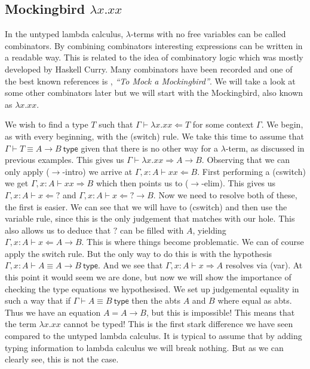 \subsection{Mockingbird \texorpdfstring{$\lambda x . x x$}{}} %

In the untyped lambda calculus, $\lambda$-terms with no free variables can be called combinators. By combining combinators interesting expressions can be written in a readable way. This is related to the idea of combinatory logic which was mostly developed by Haskell Curry. Many combinators have been recorded and one of the best known references is \cite{smullyan2012mock}, \emph{``To Mock a Mockingbird''}. We will take a look at some other combinators later but we will start with the Mockingbird, also known as $\lambda x . x x$.

\begin{example}\label{mockingbird}
    We wish to find a type $T$ such that $\Gamma \vdash \lambda x . x x \Leftarrow T$ for some context $\Gamma$. We begin, as with every beginning, with the (switch) rule. We take this time to assume that $\Gamma \vdash T \equiv A \to B \ \mathsf{type}$ given that there is no other way for a $\lambda$-term, as discussed in previous examples. This gives us $\Gamma \vdash \lambda x . x x \Rightarrow A \to B$. Observing that we can only apply ($\to$-intro) we arrive at $\Gamma , x : A\vdash x x \Leftarrow B$. First performing a (cswitch) we get $\Gamma , x : A\vdash x x \Rightarrow B$ which then points us to ($\to$-elim). This gives us $\Gamma , x : A \vdash x \Leftarrow \boxed{?}$ and $\Gamma , x : A \vdash x \Leftarrow \boxed{?} \to B$. Now we need to resolve both of these, the first is easier. We can see that we will have to (cswitch) and then use the variable rule, since this is the only judgement that matches with our hole. This also allows us to deduce that $\boxed{?}$ can be filled with $A$, yielding $\Gamma , x : A \vdash x \Leftarrow A \to B$. This is where things become problematic. We can of course apply the switch rule. But the only way to do this is with the hypothesis $\Gamma , x : A \vdash A \equiv A \to B \ \mathsf{type}$. And we see that $\Gamma , x : A \vdash x \Rightarrow A$ resolves via (var).
    At this point it would seem we are done, but now we will show the importance of checking the type equations we hypothesised. We set up judgemental equality in such a way that if $\Gamma \vdash A \equiv B \ \mathsf{type}$ then the abts $A$ and $B$ where equal as abts. Thus we have an equation $A = A \to B$, but this is impossible!
    This means that the term $\lambda x . x x$ cannot be typed! This is the first stark difference we have seen compared to the untyped lambda calculus. It is typical to assume that by adding typing information to lambda calculus we will break nothing. But as we can clearly see, this is not the case. 
\end{example}

